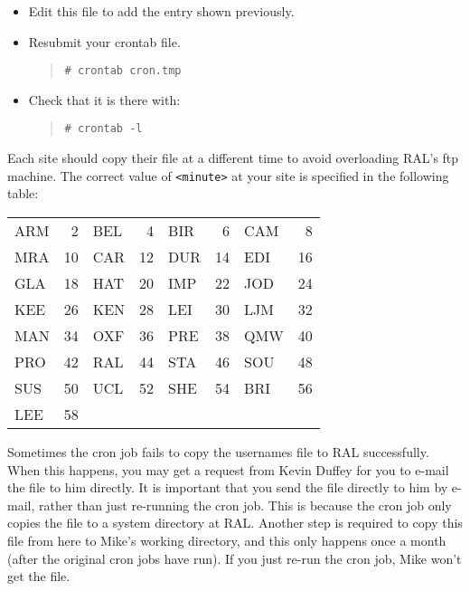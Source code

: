 \documentclass[twoside,11pt]{article}
\begin{document}
\begin{itemize}
\begin{itemize}
\item Edit this file to add the entry shown previously.

\item Resubmit your crontab file.
\begin{quote}
{\tt \# crontab cron.tmp}
\end{quote}

\item Check that it is there with:
\begin{quote}
{\tt \# crontab -l}
\end{quote}

\end{itemize}
\end{itemize}

Each site should copy their file at a different time to avoid overloading
RAL's ftp machine.
The correct value of {\tt <minute>} at your site is specified in the following
table:

\begin{table}[ht]
\begin{center}
\begin{tabular}{||lr|lr|lr|lr||} 	\hline
ARM &  2 & BEL &  4 & BIR &  6 & CAM &  8 \\
MRA & 10 & CAR & 12 & DUR & 14 & EDI & 16 \\
GLA & 18 & HAT & 20 & IMP & 22 & JOD & 24 \\
KEE & 26 & KEN & 28 & LEI & 30 & LJM & 32 \\
MAN & 34 & OXF & 36 & PRE & 38 & QMW & 40 \\
PRO & 42 & RAL & 44 & STA & 46 & SOU & 48 \\
SUS & 50 & UCL & 52 & SHE & 54 & BRI & 56 \\
LEE & 58 &     &    &     &    &     &    \\
\hline
\end{tabular}
\end{center}
\end{table}

Sometimes the cron job fails to copy the usernames file to RAL successfully.
When this happens, you may get a request from Kevin Duffey for you to
e-mail the file to him directly.
It is important that you send the file directly to him by e-mail, rather than
just re-running the cron job.
This is because the cron job only copies the file to a system directory at
RAL.
Another step is required to copy this file from here to Mike's working
directory, and this only happens once a month (after the original cron jobs
have run).
If you just re-run the cron job, Mike won't get the file.
\end{document}
